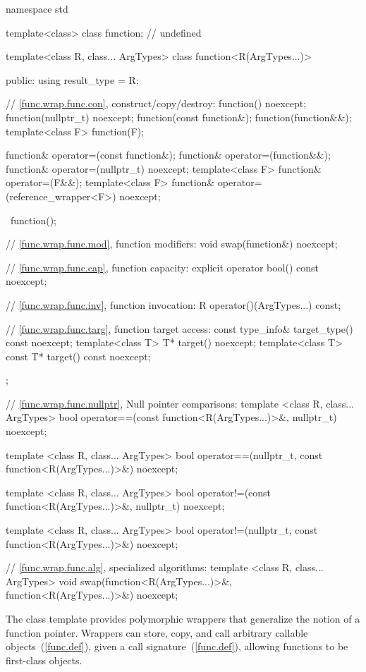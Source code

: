 \begin{codeblock}
namespace std {
  template<class> class function; // undefined

  template<class R, class... ArgTypes>
  class function<R(ArgTypes...)> {
  public:
    using result_type = R;

    // \ref{func.wrap.func.con}, construct/copy/destroy:
    function() noexcept;
    function(nullptr_t) noexcept;
    function(const function&);
    function(function&&);
    template<class F> function(F);

    function& operator=(const function&);
    function& operator=(function&&);
    function& operator=(nullptr_t) noexcept;
    template<class F> function& operator=(F&&);
    template<class F> function& operator=(reference_wrapper<F>) noexcept;

    ~function();

    // \ref{func.wrap.func.mod}, function modifiers:
    void swap(function&) noexcept;

    // \ref{func.wrap.func.cap}, function capacity:
    explicit operator bool() const noexcept;

    // \ref{func.wrap.func.inv}, function invocation:
    R operator()(ArgTypes...) const;

    // \ref{func.wrap.func.targ}, function target access:
    const type_info& target_type() const noexcept;
    template<class T>       T* target() noexcept;
    template<class T> const T* target() const noexcept;

  };

  // \ref{func.wrap.func.nullptr}, Null pointer comparisons:
  template <class R, class... ArgTypes>
    bool operator==(const function<R(ArgTypes...)>&, nullptr_t) noexcept;

  template <class R, class... ArgTypes>
    bool operator==(nullptr_t, const function<R(ArgTypes...)>&) noexcept;

  template <class R, class... ArgTypes>
    bool operator!=(const function<R(ArgTypes...)>&, nullptr_t) noexcept;

  template <class R, class... ArgTypes>
    bool operator!=(nullptr_t, const function<R(ArgTypes...)>&) noexcept;

  // \ref{func.wrap.func.alg}, specialized algorithms:
  template <class R, class... ArgTypes>
    void swap(function<R(ArgTypes...)>&, function<R(ArgTypes...)>&) noexcept;
}
\end{codeblock}

\pnum
The  class template provides polymorphic wrappers that
generalize the notion of a function pointer. Wrappers can store, copy,
and call arbitrary callable objects~(\ref{func.def}), given a call
signature~(\ref{func.def}), allowing functions to be first-class objects.

